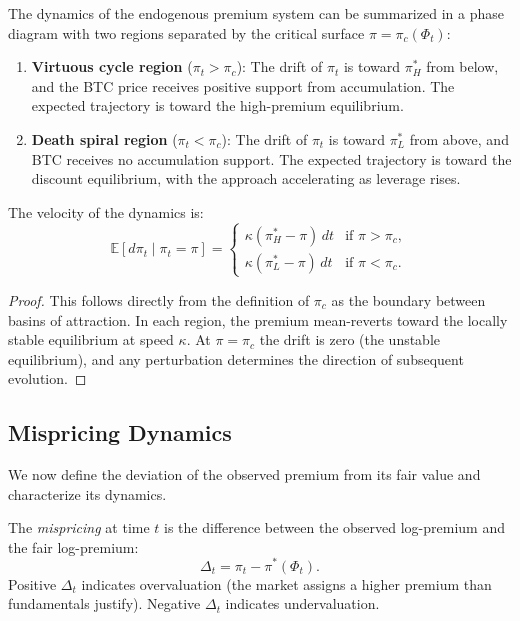 \begin{proposition}\label{prop:phase}
The dynamics of the endogenous premium system can be summarized in a
phase diagram with two regions separated by the critical surface
$\pi = \pi_c(\Phi_t)$:
\begin{enumerate}
  \item \textbf{Virtuous cycle region} ($\pi_t > \pi_c$):
    The drift of $\pi_t$ is toward $\pi_H^*$ from below, and the BTC price
    receives positive support from accumulation.  The expected trajectory is
    toward the high-premium equilibrium.
  \item \textbf{Death spiral region} ($\pi_t < \pi_c$):
    The drift of $\pi_t$ is toward $\pi_L^*$ from above, and BTC receives
    no accumulation support.  The expected trajectory is toward the discount
    equilibrium, with the approach accelerating as leverage rises.
\end{enumerate}
The velocity of the dynamics is:
\begin{equation}\label{eq:drift_pi}
  \mathbb{E}[d\pi_t \mid \pi_t = \pi] =
  \begin{cases}
    \kappa(\pi_H^* - \pi)\,dt & \text{if } \pi > \pi_c, \\[4pt]
    \kappa(\pi_L^* - \pi)\,dt & \text{if } \pi < \pi_c.
  \end{cases}
\end{equation}
\end{proposition}

\begin{proof}
This follows directly from the definition of $\pi_c$ as the boundary between
basins of attraction.  In each region, the premium mean-reverts toward the
locally stable equilibrium at speed $\kappa$.  At $\pi = \pi_c$ the drift
is zero (the unstable equilibrium), and any perturbation determines the
direction of subsequent evolution.
\end{proof}

\subsection{Mispricing Dynamics}\label{subsec:mispricing}

We now define the deviation of the observed premium from its fair value and
characterize its dynamics.

\begin{definition}[Mispricing]\label{def:mispricing}
The \emph{mispricing} at time $t$ is the difference between the observed
log-premium and the fair log-premium:
\begin{equation}\label{eq:delta_def}
  \Delta_t = \pi_t - \pi^*(\Phi_t).
\end{equation}
Positive $\Delta_t$ indicates overvaluation (the market assigns a higher
premium than fundamentals justify).  Negative $\Delta_t$ indicates
undervaluation.
\end{definition}


